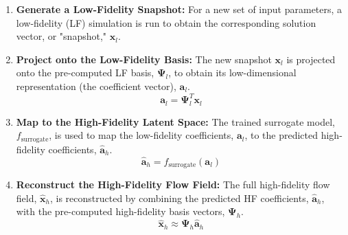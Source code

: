 \documentclass[tg, EN]{ufabcFHZh_tg}
\begin{document}
\begin{enumerate}
    \item \textbf{Generate a Low-Fidelity Snapshot:}
    For a new set of input parameters, a low-fidelity (LF) simulation is run to obtain the corresponding solution vector, or "snapshot," $\mathbf{x}_l$.

    \item \textbf{Project onto the Low-Fidelity Basis:}
    The new snapshot $\mathbf{x}_l$ is projected onto the pre-computed LF basis, $\mathbf{\Psi}_l$, to obtain its low-dimensional representation (the coefficient vector), $\mathbf{a}_l$.
    \begin{equation}
        \mathbf{a}_l = \mathbf{\Psi}_l^T \mathbf{x}_l
    \end{equation}

    \item \textbf{Map to the High-Fidelity Latent Space:}
    The trained surrogate model, $f_{\text{surrogate}}$, is used to map the low-fidelity coefficients, $\mathbf{a}_l$, to the predicted high-fidelity coefficients, $\hat{\mathbf{a}}_h$.
    \begin{equation}
        \hat{\mathbf{a}}_h = f_{\text{surrogate}}(\mathbf{a}_l)
    \end{equation}

    \item \textbf{Reconstruct the High-Fidelity Flow Field:}
    The full high-fidelity flow field, $\hat{\mathbf{x}}_h$, is reconstructed by combining the predicted HF coefficients, $\hat{\mathbf{a}}_h$, with the pre-computed high-fidelity basis vectors, $\mathbf{\Psi}_h$.
    \begin{equation}
        \hat{\mathbf{x}}_h \approx \mathbf{\Psi}_h \hat{\mathbf{a}}_h
    \end{equation}
\end{enumerate}

\end{document}
